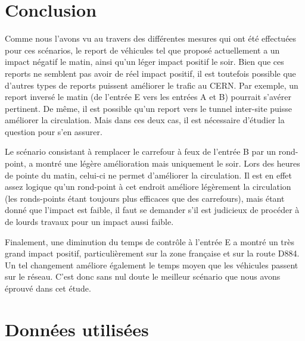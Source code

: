 \documentclass[a4paper,11pt, titlepage]{extarticle}
\begin{document}
\newpage

\section{Conclusion}

Comme nous l'avons vu au travers des différentes mesures qui ont été effectuées pour ces scénarios, le report de véhicules tel que proposé actuellement a un impact négatif le matin, ainsi qu'un léger impact positif le soir. Bien que ces reports ne semblent pas avoir de réel impact positif, il est toutefois possible que d'autres types de reports puissent améliorer le trafic au CERN. Par exemple, un report inversé le matin (de l'entrée E vers les entrées A et B) pourrait s'avérer pertinent. De même, il est possible qu'un report vers le tunnel inter-site puisse améliorer la circulation. Mais dans ces deux cas, il est nécessaire d'étudier la question pour s'en assurer.

\vspace{0.4cm}

Le scénario consistant à remplacer le carrefour à feux de l'entrée B par un rond-point, a montré une légère amélioration mais uniquement le soir. Lors des heures de pointe du matin, celui-ci ne permet d'améliorer la circulation. Il est en effet assez logique qu'un rond-point à cet endroit améliore légèrement la circulation (les ronds-points étant toujours plus efficaces que des carrefours), mais étant donné que l'impact est faible, il faut se demander s'il est judicieux de procéder à de lourds travaux pour un impact aussi faible.

\vspace{0.4cm}

Finalement, une diminution du temps de contrôle à l'entrée E a montré un très grand impact positif, particulièrement sur la zone française et sur la route D884. Un tel changement améliore également le temps moyen que les véhicules passent sur le réseau. C'est donc sans nul doute le meilleur scénario que nous avons éprouvé dans cet étude.

\newpage

\appendix

\section{\label{appData}Données utilisées}
\end{document}
